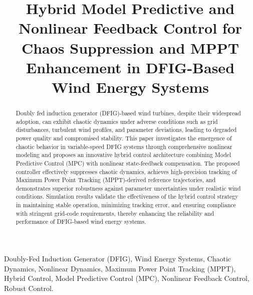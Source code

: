 \documentclass[conference]{IEEEtran}
\begin{document}
\title{Hybrid Model Predictive and Nonlinear Feedback Control for Chaos Suppression and MPPT Enhancement in DFIG-Based Wind Energy Systems}

\author{
\and
{}
\and
{}
}

\maketitle

\begin{abstract}
Doubly fed induction generator (DFIG)-based wind turbines, despite their widespread adoption, can exhibit chaotic dynamics under adverse conditions such as grid disturbances, turbulent wind profiles, and parameter deviations, leading to degraded power quality and compromised stability. This paper investigates the emergence of chaotic behavior in variable-speed DFIG systems through comprehensive nonlinear modeling and proposes an innovative hybrid control architecture combining Model Predictive Control (MPC) with nonlinear state-feedback compensation. The proposed controller effectively suppresses chaotic dynamics, achieves high-precision tracking of Maximum Power Point Tracking (MPPT)-derived reference trajectories, and demonstrates superior robustness against parameter uncertainties under realistic wind conditions. Simulation results validate the effectiveness of the hybrid control strategy in maintaining stable operation, minimizing tracking error, and ensuring compliance with stringent grid-code requirements, thereby enhancing the reliability and performance of DFIG-based wind energy systems.
\end{abstract}

\begin{IEEEkeywords}
Doubly-Fed Induction Generator (DFIG), Wind Energy Systems, Chaotic Dynamics, Nonlinear Dynamics, Maximum Power Point Tracking (MPPT), Hybrid Control, Model Predictive Control (MPC), Nonlinear Feedback Control, Robust Control.
\end{IEEEkeywords}
\end{document}
